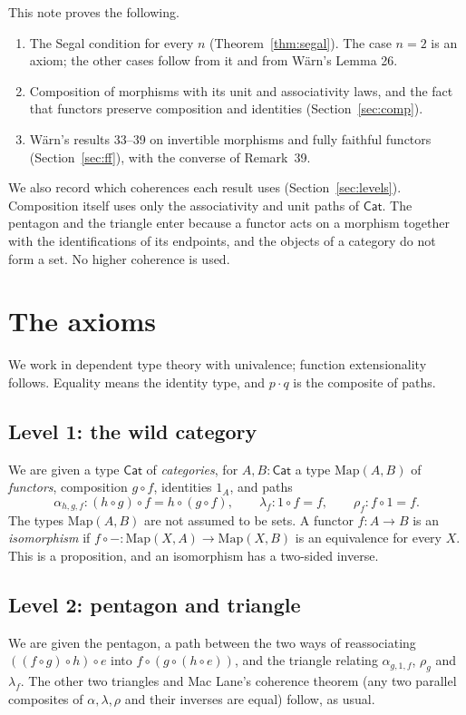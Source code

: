 \documentclass[11pt]{amsart}
\numberwithin{equation}{section}
\theoremstyle{definition}
\theoremstyle{remark}
\newcommand{\Cat}{\mathsf{Cat}}
\newcommand{\Map}{\mathrm{Map}}
\begin{document}
This note proves the following.
\begin{enumerate}
\item The Segal condition for every $n$ (Theorem~\ref{thm:segal}). The
  case $n=2$ is an axiom; the other cases follow from it and from
  W\"arn's Lemma 26.
\item Composition of morphisms with its unit and associativity laws,
  and the fact that functors preserve composition and identities
  (Section~\ref{sec:comp}).
\item W\"arn's results 33--39 on invertible morphisms and fully
  faithful functors (Section~\ref{sec:ff}), with the converse of
  Remark~39.
\end{enumerate}
We also record which coherences each result uses
(Section~\ref{sec:levels}). Composition itself uses only the
associativity and unit paths of $\Cat$. The pentagon and the triangle
enter because a functor acts on a morphism together with the
identifications of its endpoints, and the objects of a category do not
form a set. No higher coherence is used.

\section{The axioms}\label{sec:axioms}

We work in dependent type theory with univalence; function
extensionality follows. Equality means the identity type, and
$p\cdot q$ is the composite of paths.

\subsection{Level 1: the wild category}
We are given a type $\Cat$ of \emph{categories}, for $A,B:\Cat$ a type
$\Map(A,B)$ of \emph{functors}, composition $g\circ f$, identities
$1_A$, and paths
\[
\alpha_{h,g,f}:(h\circ g)\circ f=h\circ(g\circ f),\qquad
\lambda_f:1\circ f=f,\qquad \rho_f:f\circ 1=f.
\]
The types $\Map(A,B)$ are not assumed to be sets.
A functor $f:A\to B$ is an \emph{isomorphism} if
$f\circ-:\Map(X,A)\to\Map(X,B)$ is an equivalence for every $X$. This is
a proposition, and an isomorphism has a two-sided inverse.

\subsection{Level 2: pentagon and triangle}
We are given the pentagon, a path between the two ways of reassociating
$((f\circ g)\circ h)\circ e$ into $f\circ(g\circ(h\circ e))$, and the
triangle relating $\alpha_{g,1,f}$, $\rho_g$ and $\lambda_f$. The other
two triangles and Mac Lane's coherence theorem (any two parallel
composites of $\alpha,\lambda,\rho$ and their inverses are equal)
follow, as usual.
\end{document}
